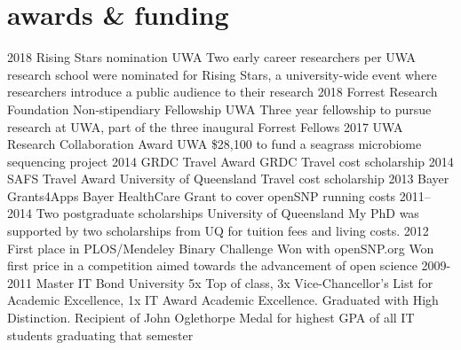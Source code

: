 \documentclass[]{friggeri-cv} %
\begin{document}
\newpage

\section{awards \& funding}

\begin{entrylist}
\entry
{2018}
{Rising Stars nomination}
{UWA}
{Two early career researchers per UWA research school were nominated for Rising Stars, a university-wide event where researchers introduce a public audience to their research}
\entry
{2018}
{Forrest Research Foundation Non-stipendiary Fellowship}
{UWA}
{Three year fellowship to pursue research at UWA, part of the three inaugural Forrest Fellows}
\entry
{2017}
{UWA Research Collaboration Award}
{UWA}
{\$28,100 to fund a seagrass microbiome sequencing project}
\entry
{2014}
{GRDC Travel Award}
{GRDC}
{Travel cost scholarship}
\entry
{2014}
{SAFS Travel Award}
{University of Queensland}
{Travel cost scholarship}
\entry
{2013}
{Bayer Grants4Apps}
{Bayer HealthCare}
{Grant to cover openSNP running costs}
\entry
{2011--2014}
{Two postgraduate scholarships}
{University of Queensland}
{My PhD was supported by two scholarships from UQ for tuition fees and living costs.}
\entry
{2012}
{First place in PLOS/Mendeley Binary Challenge}
{Won with openSNP.org}
{Won first price in a competition aimed towards the advancement of open science}
\entry
{2009-2011}
{Master IT}
{Bond University}
{5x Top of class,  3x Vice-Chancellor's List for Academic Excellence, 1x IT Award Academic Excellence. Graduated with High Distinction. Recipient of John Oglethorpe Medal for highest GPA of all IT students graduating that semester}
\end{entrylist}


\end{document}
